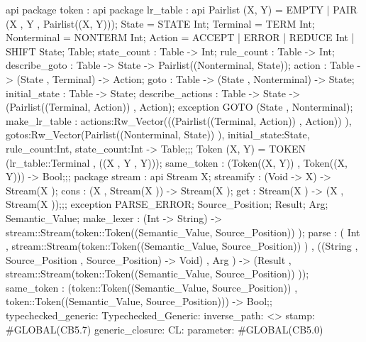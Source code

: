 api {   package token
          : api {   package lr_table
                      : api {
                            Pairlist (X, Y) = EMPTY | PAIR (X , Y , Pairlist((X, Y)));
                            State  = STATE Int;
                            Terminal  = TERM Int;
                            Nonterminal  = NONTERM Int;
                            Action  = ACCEPT | ERROR | REDUCE Int | SHIFT State;
                            Table;
                            state_count : Table -> Int;
                            rule_count : Table -> Int;
                            describe_goto : Table -> State -> Pairlist((Nonterminal, State));
                            action : Table -> (State , Terminal) -> Action;
                            goto : Table -> (State , Nonterminal) -> State;
                            initial_state : Table -> State;
                            describe_actions : Table -> State -> (Pairlist((Terminal, Action)) , Action);
                            exception GOTO (State , Nonterminal);
                                make_lr_table :
                                        {actions:Rw_Vector(((Pairlist((Terminal, Action)) , Action)) ),
                                        gotos:Rw_Vector(Pairlist((Nonterminal, State)) ), initial_state:State, rule_count:Int,
                                        state_count:Int}
                                    ->
                                    Table;};;
                Token (X, Y) = TOKEN (lr_table::Terminal , ((X , Y , Y)));
                same_token : (Token((X, Y)) , Token((X, Y))) -> Bool;};;
        package stream
          : api {
                Stream X;
                streamify : (Void -> X) -> Stream(X );
                cons : (X , Stream(X )) -> Stream(X );
                get : Stream(X ) -> (X , Stream(X ));};;
    exception PARSE_ERROR;
    Source_Position;
    Result;
    Arg;
    Semantic_Value;
    make_lexer : (Int -> String) -> stream::Stream(token::Token((Semantic_Value, Source_Position)) );
        parse :
            (   Int , stream::Stream(token::Token((Semantic_Value, Source_Position)) ) ,
                ((String , Source_Position , Source_Position) -> Void) , Arg
            )
            ->
            (Result , stream::Stream(token::Token((Semantic_Value, Source_Position)) ));
        same_token :
            (token::Token((Semantic_Value, Source_Position)) , token::Token((Semantic_Value, Source_Position)))
            ->
            Bool;};
typechecked_generic:
Typechecked_Generic:
inverse_path: <>
stamp: #GLOBAL(CB5.7)
generic_closure:
CL:
parameter: #GLOBAL(CB5.0)

